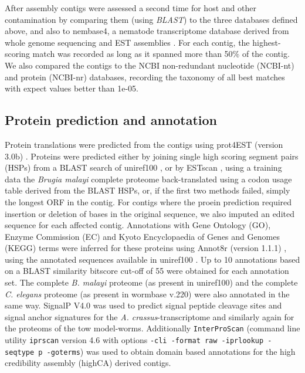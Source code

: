 \documentclass[10pt]{bmc_article}
\newenvironment{bmcformat}{\begin{raggedright}\baselineskip20pt\sloppy\setboolean{publ}{false}}{\end{raggedright}\baselineskip20pt\sloppy}
\begin{document}
\begin{bmcformat}
After assembly contigs were assessed a second time for host and other
contamination by comparing them (using \textit{BLAST}) to the three
databases defined above, and also to nembase4, a nematode
transcriptome database derived from whole genome sequencing and EST
assemblies \cite{parkinson_nembase:resource_2004, pmid21550347}. For
each contig, the highest-scoring match was recorded as long as it
spanned more than 50\% of the contig. We also compared the contigs to
the NCBI non-redundant nucleotide (NCBI-nt) and protein (NCBI-nr)
databases, recording the taxonomy of all best matches with expect
values better than 1e-05.

\subsection*{Protein prediction and annotation}

Protein translations were predicted from the contigs using prot4EST
(version 3.0b) \cite{wasmuth_prot4est:_2004}. Proteins were predicted
either by joining single high scoring segment pairs (HSPs) from a
BLAST search of uniref100 \cite{pmid18836194}, or by ESTscan
\cite{estscan}, using a training data the \textit{Brugia malayi}
complete proteome back-translated using a codon usage table derived
from the BLAST HSPs, or, if the first two methods failed, simply the
longest ORF in the contig. For contigs where the proein prediction
required insertion or deletion of bases in the original sequence, we
also imputed an edited sequence for each affected contig. Annotations
with Gene Ontology (GO), Enzyme Commission (EC) and Kyoto
Encyclopaedia of Genes and Genomes (KEGG) terms were inferred for
these proteins using Annot8r (version 1.1.1)
\cite{schmid_annot8r:_2008}, using the annotated sequences available
in uniref100 \cite{pmid18836194}. Up to 10 annotations based on a
BLAST similarity bitscore cut-off of 55 were obtained for each
annotation set. The complete \textit{B. malayi} proteome (as present
in uniref100) and the complete \textit{C. elegans} proteome (as
present in wormbase v.220) were also annotated in the same
way. SignalP V4.0 \cite{pmid21959131} was used to predict signal
peptide cleavage sites and signal anchor signatures for the
\textit{A. crassus}-transcriptome and similarly again for the proteoms
of the tow model-worms.  Additionally \texttt{InterProScan}
\cite{pmid11590104} (command line utility \texttt{iprscan} version 4.6
with options \texttt{-cli -format raw -iprlookup -seqtype p -goterms})
was used to obtain domain based annotations for the high credibility
assembly (highCA) derived contigs.


\end{bmcformat}
\end{document}
